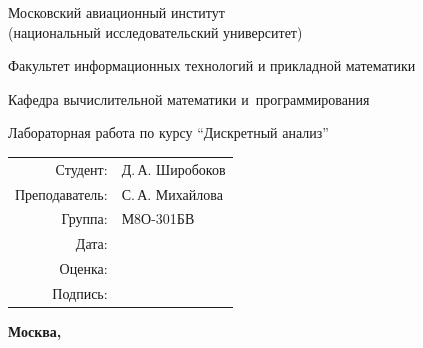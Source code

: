 \begin{titlepage}
\begin{center}
\bfseries

{\Large Московский авиационный институт\\ (национальный исследовательский университет)

}

\vspace{48pt}

{\large Факультет информационных технологий и прикладной математики
}

\vspace{36pt}

{\large Кафедра вычислительной математики и~программирования

}


\vspace{48pt}

Лабораторная работа  по курсу \enquote{Дискретный анализ}

\end{center}

\vspace{72pt}

\begin{flushright}
\begin{tabular}{rl}
Студент: & Д.\,А. Широбоков \\
Преподаватель: & С.\,А. Михайлова \\
Группа: & М8О-301БВ \\
Дата: & \\
Оценка: & \\
Подпись: & \\
\end{tabular}
\end{flushright}

\vfill

\begin{center}
\bfseries
Москва, \the\year
\end{center}
\end{titlepage}

\pagebreak
